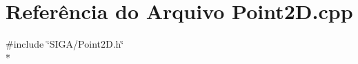 \section{Referência do Arquivo Point2\+D.\+cpp}
\label{_point2_d_8cpp}
{\ttfamily \#include \char`\"{}S\+I\+G\+A/\+Point2\+D.\+h\char`\"{}}\\*
